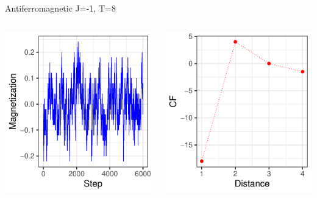 \documentclass{beamer}
\begin{document}
\begin{frame}{Antiferromagnetic J=-1, T=8}
\begin{columns}
\begin{column}{0.5\textwidth}
    \begin{center}
     \includegraphics[width=\textwidth]{Pic/J-1_60_2500_T=8_Magnetization.pdf}
     \end{center}
\end{column}
\begin{column}{0.5\textwidth}
    \begin{center}
     \includegraphics[width=\textwidth]{Pic/J-1_60_2500_T=8_CORRELATION.pdf}

\end{center}
\end{column}
\end{columns}
\end{frame}
\end{document}
